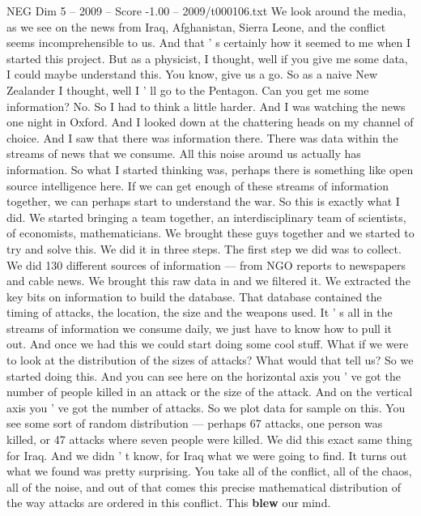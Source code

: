 \begin{textsample}{NEG Dim 5 – 2009 – Score -1.00 – 2009/t000106.txt}  \label{ex:f5_neg_047}
We look around the media, as we see on the news from Iraq, Afghanistan, Sierra Leone, and the conflict seems incomprehensible to us.
And that ' s certainly how it seemed to me when I started this project.
But as a physicist, I thought, well if you give me some data, I could maybe understand this.
You know, give us a go.
So as a naive New Zealander I thought, well I ' ll go to the Pentagon.
Can you get me some information?
No.
So I had to think a little harder.
And I was watching the news one night in Oxford.
And I looked down at the chattering heads on my channel of choice.
And I saw that there was information there.
There was data within the streams of news that we consume.
All this noise around us actually has information.
So what I started thinking was, perhaps there is something like open source intelligence here.
If we can get enough of these streams of information together, we can perhaps start to understand the war.
So this is exactly what I did.
We started bringing a team together, an interdisciplinary team of scientists, of economists, mathematicians.
We brought these guys together and we started to try and solve this.
We did it in three steps.
The first step we did was to collect.
We did 130 different sources of information — from NGO reports to newspapers and cable news.
We brought this raw data in and we filtered it.
We extracted the key bits on information to build the database.
That database contained the timing of attacks, the location, the size and the weapons used.
It ' s all in the streams of information we consume daily, we just have to know how to pull it out.
And once we had this we could start doing some cool stuff.
What if we were to look at the distribution of the sizes of attacks?
What would that tell us?
So we started doing this.
And you can see here on the horizontal axis you ' ve got the number of people killed in an attack or the size of the attack.
And on the vertical axis you ' ve got the number of attacks.
So we plot data for sample on this.
You see some sort of random distribution — perhaps 67 attacks, one person was killed, or 47 attacks where seven people were killed.
We did this exact same thing for Iraq.
And we didn ' t know, for Iraq what we were going to find.
It turns out what we found was pretty surprising.
You take all of the conflict, all of the chaos, all of the noise, and out of that comes this precise mathematical distribution of the way attacks are ordered in this conflict.
This \textbf{blew} our mind.

\end{textsample}
